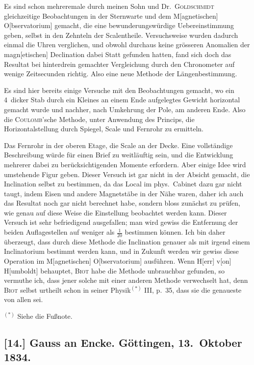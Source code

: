 \documentclass[12pt,a4paper]{article}
\begin{document}
Es sind schon mehreremale durch meinen Sohn und Dr.~\textsc{Goldschmidt} gleichzeitige Beobachtungen in der Sternwarte und dem M[agnetischen] O[bservatorium] gemacht, die eine bewunderungsw\"urdige Uebereinstimmung geben, selbst in den Zehnteln der Scalentheile. Versuchsweise wurden dadurch einmal die Uhren verglichen, und obwohl durchaus keine gr\"osseren Anomalien der magn[etischen] Declination dabei Statt gefunden hatten, fand sich doch das Resultat bei hinterdrein gemachter Vergleichung durch den Chronometer auf wenige Zeitsecunden richtig. Also eine neue Methode der L\"angenbestimmung.

Es sind hier bereits einige Versuche mit den Beobachtungen gemacht, wo ein 4~\textPi dicker Stab durch ein Kleines an einem Ende aufgelegtes Gewicht horizontal gemacht wurde und nachher, nach Umkehrung der Pole, am anderen Ende. Also die \textsc{Coulomb}'sche Methode, unter Anwendung des Princips, die Horizontalstellung durch Spiegel, Scale und Fernrohr zu ermitteln.

Das Fernrohr in der oberen Etage, die Scale an der Decke. Eine vollst\"andige Beschreibung w\"urde f\"ur einen Brief zu weitl\"auftig sein, und die Entwicklung mehrerer dabei zu ber\"ucksichtigenden Momente erfordern. Aber einige Idee wird umstehende Figur geben. Dieser Versuch ist gar nicht in der Absicht gemacht, die Inclination selbst zu bestimmen, da das Local im phys.~Cabinet dazu gar nicht taugt, indem Eisen und andere Magnetst\"abe in der N\"ahe waren, daher ich auch das Resultat noch gar nicht berechnet habe, sondern bloss zun\"achst zu pr\"ufen, wie genau auf diese Weise die Einstellung beobachtet werden kann. Dieser Versuch ist sehr befriedigend ausgefallen; man wird gewiss die Entfernung der beiden Auflagestellen auf weniger als $\frac1{20}$ bestimmen k\"onnen. Ich bin daher \"uberzeugt, dass durch diese Methode die Inclination genauer als mit irgend einem Inclinatorium bestimmt werden kann, und in Zukunft werden wir gewiss diese Operation im M[agnetischen] O[bservatorium] ausf\"uhren. Wenn H[err] v[on] H[umboldt] behauptet, \textsc{Biot} habe die Methode unbrauchbar gefunden, so vermuthe ich, dass jener solche mit einer anderen Methode verwechselt hat, denn \textsc{Biot} selbst urtheilt schon in seiner Physik$^{(*)}$ III, p.~35, dass sie die genaueste von allen sei.

\medskip\noindent
$^{(*)}$ Siehe die Fu\ss note.

\subsection*{[14.] Gauss an Encke. G\"ottingen, 13.~Oktober 1834.}
\end{document}
